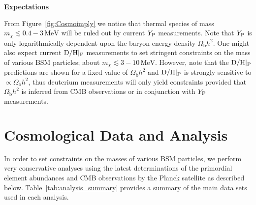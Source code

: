 \documentclass[notitlepage,letterpaper,natbib,aps,prd,onecolumn,amsmath,amsfonts,nofootinbib,preprintnumbers,superscriptaddress,secnumarabic,groupedaddress]{revtex4-1}
\begin{document}
\vspace{0.1cm}
\textbf{Expectations}

From Figure~\ref{fig:Cosmoimply} we notice that thermal species of mass $m_\chi \lesssim 0.4-3\,\text{MeV}$ will be ruled out by current $Y_{\rm P}$ measurements. Note that $Y_{\rm P}$ is only logarithmically dependent upon the baryon energy density $\Omega_\mathrm{b}h^2$. One might also expect current ${\rm D/H}|_{\rm P}$ measurements to set stringent constraints on the mass of various BSM particles; about $m_\chi \lesssim 3-10\,\text{MeV}$. However, note that the ${\rm D/H}|_{\rm P}$ predictions are shown for a fixed value of $\Omega_\mathrm{b} h^2$ and ${\rm D/H}|_{\rm P}$ is strongly sensitive to $\propto \Omega_\mathrm{b} h^2$, thus deuterium measurements will only yield constraints provided that $\Omega_\mathrm{b} h^2$ is inferred from CMB observations or in conjunction with $Y_{\rm P}$ measurements.




\vspace{-0.05 cm}
\section{Cosmological Data and Analysis}\label{sec:current_data_analyis}
\vspace{-0.05 cm}

In order to set constraints on the masses of various BSM particles, we perform very conservative analyses using the latest determinations of the primordial element abundances and CMB observations by the Planck satellite as described below. Table~\ref{tab:analysis_summary} provides a summary of the main data sets used in each analysis. 
\end{document}
